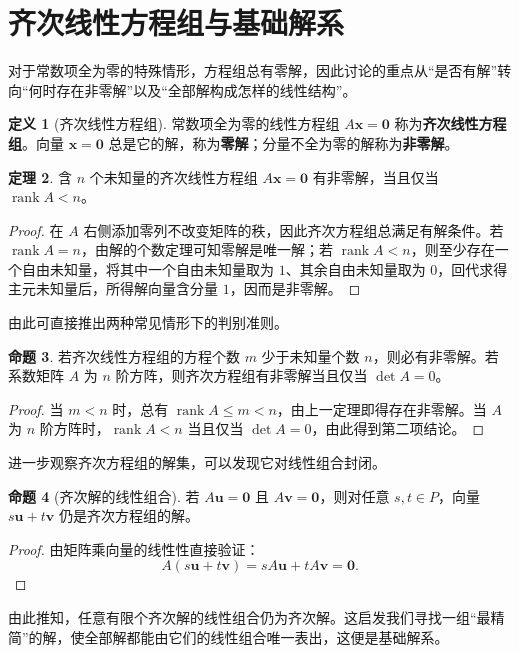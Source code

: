 \documentclass[UTF8, fontset=fandol, a4paper, 12pt]{ctexart}
\newcommand{\rank}{\operatorname{rank}}
\newcommand{\vx}{\boldsymbol{x}}
\newcommand{\vo}{\boldsymbol{0}}
\theoremstyle{definition}
\newtheorem{definition}{定义}[section]
\newtheorem{proposition}[definition]{命题}
\newtheorem{theorem}[definition]{定理}
\begin{document}
\section{齐次线性方程组与基础解系}

对于常数项全为零的特殊情形，方程组总有零解，因此讨论的重点从“是否有解”转向“何时存在非零解”以及“全部解构成怎样的线性结构”。

\begin{definition}[齐次线性方程组]
常数项全为零的线性方程组 $A\vx=\vo$ 称为\textbf{齐次线性方程组}。向量 $\vx=\vo$ 总是它的解，称为\textbf{零解}；分量不全为零的解称为\textbf{非零解}。
\end{definition}

\begin{theorem}
含 $n$ 个未知量的齐次线性方程组 $A\vx=\vo$ 有非零解，当且仅当 $\rank A<n$。
\end{theorem}
\begin{proof}
在 $A$ 右侧添加零列不改变矩阵的秩，因此齐次方程组总满足有解条件。若 $\rank A=n$，由解的个数定理可知零解是唯一解；若 $\rank A<n$，则至少存在一个自由未知量，将其中一个自由未知量取为 $1$、其余自由未知量取为 $0$，回代求得主元未知量后，所得解向量含分量 $1$，因而是非零解。
\end{proof}

由此可直接推出两种常见情形下的判别准则。

\begin{proposition}
若齐次线性方程组的方程个数 $m$ 少于未知量个数 $n$，则必有非零解。若系数矩阵 $A$ 为 $n$ 阶方阵，则齐次方程组有非零解当且仅当 $\det A=0$。
\end{proposition}
\begin{proof}
当 $m<n$ 时，总有 $\rank A\le m<n$，由上一定理即得存在非零解。当 $A$ 为 $n$ 阶方阵时，$\rank A<n$ 当且仅当 $\det A=0$，由此得到第二项结论。
\end{proof}

进一步观察齐次方程组的解集，可以发现它对线性组合封闭。

\begin{proposition}[齐次解的线性组合]
若 $A\boldsymbol u=\vo$ 且 $A\boldsymbol v=\vo$，则对任意 $s,t\in P$，向量 $s\boldsymbol u+t\boldsymbol v$ 仍是齐次方程组的解。
\end{proposition}
\begin{proof}
由矩阵乘向量的线性性直接验证：
\[
 A(s\boldsymbol u+t\boldsymbol v)=sA\boldsymbol u+tA\boldsymbol v=\vo.
\]
\end{proof}

由此推知，任意有限个齐次解的线性组合仍为齐次解。这启发我们寻找一组“最精简”的解，使全部解都能由它们的线性组合唯一表出，这便是基础解系。
\end{document}

